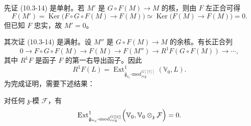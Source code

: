 先证 (10.3-14) 是单射。若 $M'$ 是 $G\circ F(M)\to M$ 的核，则由 $F$ 左正合可得
\[
    F(M')=\operatorname{Ker}\bigl(F\circ G\circ F(M)\to F(M)\bigr)
    \simeq\operatorname{Ker}\bigl(F(M)\to F(M)\bigr)=0.
\]
但已知 $F$ 忠实，故 $M'=0$。

其次证 (10.3-14) 是满射。设 $M''$ 是 $G\circ F(M)\to M$ 的余核。有长正合列
\begin{equation}
    0\to F\circ G\circ F(M)\to F(M)\to F(M'')\to R^1F(G\circ F(M))\to\cdots,
    \tag{10.3-15}
\end{equation}
其中 $R^1F$ 是函子 $F$ 的第一右导出函子。因此
\[
    R^1F(L)=\operatorname{Ext}^1_{\hat{\mathfrak{g}}_{\kappa_c}\text{-mod}^{G[[t]]}_{reg}}
    (\mathbb{V}_0,L).
\]
为完成证明，需要下述结果：

\begin{lemma}
    对任何 $\mathfrak{z}$-模 $\mathcal{F}$，有
    \[
        \operatorname{Ext}^1_{\hat{\mathfrak{g}}_{\kappa_c}\text{-mod}^{G[[t]]}_{reg}}
        \Bigl(\mathbb{V}_0,\mathbb{V}_0\otimes_{\mathfrak{z}}\mathcal{F}\Bigr)=0.
    \]
\end{lemma}

